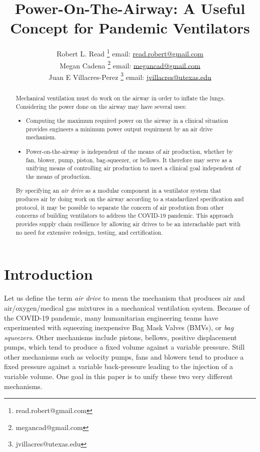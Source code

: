 \documentclass{article}
\title{Power-On-The-Airway: A Useful Concept for Pandemic Ventilators}
\author{Robert L. Read
  \thanks{read.robert@gmail.com}
  email: \href{mailto:read.robert@gmail.com}{read.robert@gmail.com}\\
Megan Cadena
  \thanks{megancad@gmail.com}
  email: \href{mailto:megancad@gmail.com}{megancad@gmail.com}\\
  Juan E Villacres-Perez
  \thanks{jvillacres@utexas.edu}
  email: \href{mailto:jvillacres@utexas.edu}{jvillacres@utexas.edu}
  }
\begin{document}
\maketitle
\begin{abstract}
  Mechanical ventilation must do work on the airway in order to inflate the lungs.
  Considering the power done on the airway may have several uses:
  \begin{itemize}
  \item Computing the maximum required power on the airway in
    a clinical situation provides engineers a minimum power output requirment
    by an air drive mechanism.
  \item Power-on-the-airway is independent of the means of air production,
    whether by fan, blower, pump, piston, bag-squeezer, or bellows. It therefore
    may serve as a unifying means of controlling air production to meet
    a clinical goal independent of the means of production.
  \end{itemize}
  By specifying an {\em air drive} as a modular component in a ventilator
  system that produces air by doing work on the airway according to a
  standardized specification and protocol, it may be possible to
  separate the concern of air prodution from other concerns of building
  ventilators to address the COVID-19 pandemic. This approach provides
  supply chain resillience by allowing air drives to be an interachable part with
  no need for extensive redesign, testing, and certification.
\end{abstract}


\section{Introduction}

Let us define the term {\em air drive} to mean the mechanism that
produces air and air/oxygen/medical gas mixtures in a mechanical
ventilation system. Because of the
COVID-19 pandemic, many humanitarian engineering teams have
experimented with squeezing inexpensive Bag Mask Valves (BMVs), or
{\em bag squeezers}.
Other mechanisms include pistons, bellows,
positive displacement pumps, which tend to produce a fixed volume against
a variable pressure.
Still other mechanisms such as velocity pumps,
fans and blowers tend to produce a fixed
pressure against a variable back-pressure leading to the injection
of a variable volume. One goal in this paper is to unify these
two very different mechanisms.
\end{document}
